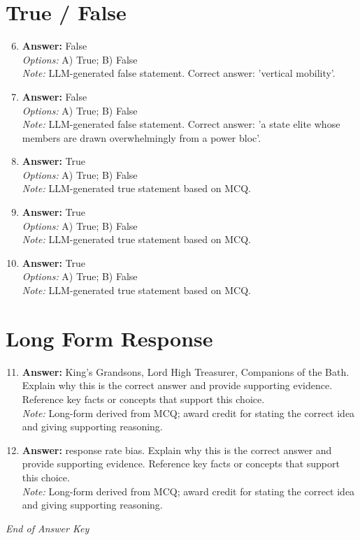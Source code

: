 \documentclass[12pt]{article}
\begin{document}
\section*{True / False}
\begin{enumerate}[label=\arabic*.]
\setcounter{enumi}{5}
\item \textbf{Answer:} False
\\ \textit{Options:} A) True; B) False
\\ \textit{Note:} LLM-generated false statement. Correct answer: 'vertical mobility'.
\item \textbf{Answer:} False
\\ \textit{Options:} A) True; B) False
\\ \textit{Note:} LLM-generated false statement. Correct answer: 'a state elite whose members are drawn overwhelmingly from a power bloc'.
\item \textbf{Answer:} True
\\ \textit{Options:} A) True; B) False
\\ \textit{Note:} LLM-generated true statement based on MCQ.
\item \textbf{Answer:} True
\\ \textit{Options:} A) True; B) False
\\ \textit{Note:} LLM-generated true statement based on MCQ.
\item \textbf{Answer:} True
\\ \textit{Options:} A) True; B) False
\\ \textit{Note:} LLM-generated true statement based on MCQ.
\end{enumerate}

\section*{Long Form Response}
\begin{enumerate}[label=\arabic*.]
\setcounter{enumi}{10}
\item \textbf{Answer:} King's Grandsons, Lord High Treasurer, Companions of the Bath. Explain why this is the correct answer and provide supporting evidence. Reference key facts or concepts that support this choice.
\\ \textit{Note:} Long-form derived from MCQ; award credit for stating the correct idea and giving supporting reasoning.
\item \textbf{Answer:} response rate bias. Explain why this is the correct answer and provide supporting evidence. Reference key facts or concepts that support this choice.
\\ \textit{Note:} Long-form derived from MCQ; award credit for stating the correct idea and giving supporting reasoning.
\end{enumerate}

\vfill
\noindent\textit{End of Answer Key}
\end{document}
